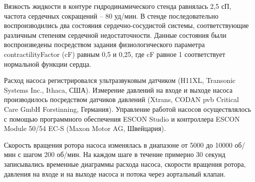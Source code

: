 Вязкость жидкости в контуре гидродинамического стенда равнялась 2,5 сП, частота сердечных сокращений -- 80 уд/мин. В стенде последовательно воспроизводились два состояния сердечно-сосудистой системы, соответствующие различным степеням сердечной недостаточности. Данные состояния были воспроизведены посредством задания физиологического параметра contractilityFactor (cF) равным 0,5 и 0,25, где cF равное 1 соответствует нормальной функции сердца.

Расход насоса регистрировался ультразвуковым датчиком (H11XL, Transonic Systems Inc., Ithaca, США). Измерение давлений на входе и выходе насоса производилось посредством датчиков давлений (Xtrans, CODAN pvb Critical Care GmbH Forstinning, Германия). Управление работой насосов осуществлялось с помощью программного обеспечения ESCON Studio и контроллера ESCON Module 50/54 EC-S (Maxon Motor AG, Швейцария).

% 
% 
% 

Скорость вращения ротора насоса изменялась в диапазоне от 5000 до 10000 об/мин с шагом 200 об/мин. На каждом шаге в течение примерно 30 секунд записывались временные диаграммы расхода насоса, скорости вращения ротора, давления на входе и на выходе насоса и потока через аортальный клапан. %

